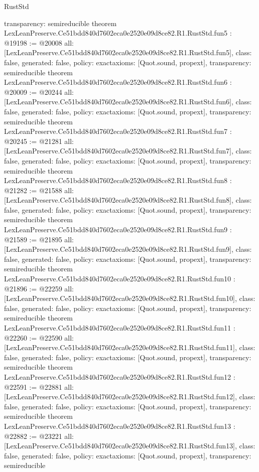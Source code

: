 \begin{lexlean}{RustStd}
\begin{coremodule}
{  transparency: semireducible
}
theorem LexLeanPreserve.Ce51bdd840d7602eca0e2520e09d8ce82.R1.RustStd.fun5 : @19198 := @20008 {
  all: [LexLeanPreserve.Ce51bdd840d7602eca0e2520e09d8ce82.R1.RustStd.fun5],
  class: false,
  generated: false,
  policy: exact{axioms: [Quot.sound, propext]},
  transparency: semireducible
}
theorem LexLeanPreserve.Ce51bdd840d7602eca0e2520e09d8ce82.R1.RustStd.fun6 : @20009 := @20244 {
  all: [LexLeanPreserve.Ce51bdd840d7602eca0e2520e09d8ce82.R1.RustStd.fun6],
  class: false,
  generated: false,
  policy: exact{axioms: [Quot.sound, propext]},
  transparency: semireducible
}
theorem LexLeanPreserve.Ce51bdd840d7602eca0e2520e09d8ce82.R1.RustStd.fun7 : @20245 := @21281 {
  all: [LexLeanPreserve.Ce51bdd840d7602eca0e2520e09d8ce82.R1.RustStd.fun7],
  class: false,
  generated: false,
  policy: exact{axioms: [Quot.sound, propext]},
  transparency: semireducible
}
theorem LexLeanPreserve.Ce51bdd840d7602eca0e2520e09d8ce82.R1.RustStd.fun8 : @21282 := @21588 {
  all: [LexLeanPreserve.Ce51bdd840d7602eca0e2520e09d8ce82.R1.RustStd.fun8],
  class: false,
  generated: false,
  policy: exact{axioms: [Quot.sound, propext]},
  transparency: semireducible
}
theorem LexLeanPreserve.Ce51bdd840d7602eca0e2520e09d8ce82.R1.RustStd.fun9 : @21589 := @21895 {
  all: [LexLeanPreserve.Ce51bdd840d7602eca0e2520e09d8ce82.R1.RustStd.fun9],
  class: false,
  generated: false,
  policy: exact{axioms: [Quot.sound, propext]},
  transparency: semireducible
}
theorem LexLeanPreserve.Ce51bdd840d7602eca0e2520e09d8ce82.R1.RustStd.fun10 : @21896 := @22259 {
  all: [LexLeanPreserve.Ce51bdd840d7602eca0e2520e09d8ce82.R1.RustStd.fun10],
  class: false,
  generated: false,
  policy: exact{axioms: [Quot.sound, propext]},
  transparency: semireducible
}
theorem LexLeanPreserve.Ce51bdd840d7602eca0e2520e09d8ce82.R1.RustStd.fun11 : @22260 := @22590 {
  all: [LexLeanPreserve.Ce51bdd840d7602eca0e2520e09d8ce82.R1.RustStd.fun11],
  class: false,
  generated: false,
  policy: exact{axioms: [Quot.sound, propext]},
  transparency: semireducible
}
theorem LexLeanPreserve.Ce51bdd840d7602eca0e2520e09d8ce82.R1.RustStd.fun12 : @22591 := @22881 {
  all: [LexLeanPreserve.Ce51bdd840d7602eca0e2520e09d8ce82.R1.RustStd.fun12],
  class: false,
  generated: false,
  policy: exact{axioms: [Quot.sound, propext]},
  transparency: semireducible
}
theorem LexLeanPreserve.Ce51bdd840d7602eca0e2520e09d8ce82.R1.RustStd.fun13 : @22882 := @23221 {
  all: [LexLeanPreserve.Ce51bdd840d7602eca0e2520e09d8ce82.R1.RustStd.fun13],
  class: false,
  generated: false,
  policy: exact{axioms: [Quot.sound, propext]},
  transparency: semireducible
}
\end{coremodule}
\end{lexlean}
